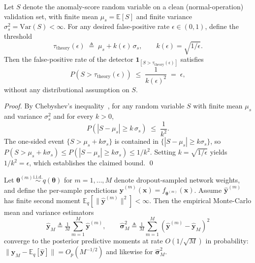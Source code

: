 \begin{Theorem}
\label{thm:chebyshev_fp}
Let $S$ denote the anomaly-score random variable on a clean (normal-operation) validation set, with finite mean $\mu_s = \mathbb{E}[S]$ and finite variance $\sigma_s^2 = \mathrm{Var}(S) < \infty$. For any desired false-positive rate $\epsilon \in (0,1)$, define the threshold
\begin{equation*}
\tau_{\mathrm{theory}}(\epsilon) \;\triangleq\; \mu_s + k(\epsilon)\,\sigma_s, \qquad k(\epsilon) = \sqrt{1/\epsilon}.
\end{equation*}
Then the false-positive rate of the detector $\mathbf{1}_{[S > \tau_{\mathrm{theory}}(\epsilon)]}$ satisfies
\begin{equation*}
P\!\left(S > \tau_{\mathrm{theory}}(\epsilon)\right) \;\leq\; \frac{1}{k(\epsilon)^{2}} \;=\; \epsilon,
\end{equation*}
without any distributional assumption on $S$.
\end{Theorem}

\begin{proof}
By Chebyshev's inequality~\cite{aggarwal2017outlier}, for any random variable $S$ with finite mean $\mu_s$ and variance $\sigma_s^2$ and for every $k > 0$,
\begin{equation*}
P\!\left(|S - \mu_s| \geq k\,\sigma_s\right) \;\leq\; \frac{1}{k^{2}}.
\end{equation*}
The one-sided event $\{S > \mu_s + k\sigma_s\}$ is contained in $\{|S - \mu_s| \geq k\sigma_s\}$, so
$P(S > \mu_s + k\sigma_s) \leq P(|S - \mu_s| \geq k\sigma_s) \leq 1/k^2$.
Setting $k = \sqrt{1/\epsilon}$ yields $1/k^{2} = \epsilon$, which establishes the claimed bound. \qed
\end{proof}

\begin{Theorem}
\label{thm:mc_convergence}
Let $\boldsymbol{\theta}^{(m)} \overset{\mathrm{i.i.d.}}{\sim} q(\boldsymbol{\theta})$ for $m = 1,\dots,M$ denote dropout-sampled network weights, and define the per-sample predictions $\hat{\mathbf{y}}^{(m)}(\mathbf{x}) = f_{\boldsymbol{\theta}^{(m)}}(\mathbf{x})$. Assume $\hat{\mathbf{y}}^{(m)}$ has finite second moment $\mathbb{E}_{q}[\|\hat{\mathbf{y}}^{(m)}\|^{2}] < \infty$. Then the empirical Monte-Carlo mean and variance estimators
\begin{equation*}
\hat{\mathbf{y}}_M \triangleq \tfrac{1}{M}\sum_{m=1}^{M} \hat{\mathbf{y}}^{(m)}, \qquad
\widehat{\boldsymbol{\sigma}}^{2}_M \triangleq \tfrac{1}{M}\sum_{m=1}^{M} (\hat{\mathbf{y}}^{(m)} - \hat{\mathbf{y}}_M)^{2}
\end{equation*}
converge to the posterior predictive moments at rate $O(1/\sqrt{M})$ in probability:
$\| \hat{\mathbf{y}}_M - \mathbb{E}_{q}[\hat{\mathbf{y}}] \| = O_p(M^{-1/2})$ and likewise for $\widehat{\boldsymbol{\sigma}}^{2}_M$.
\end{Theorem}

